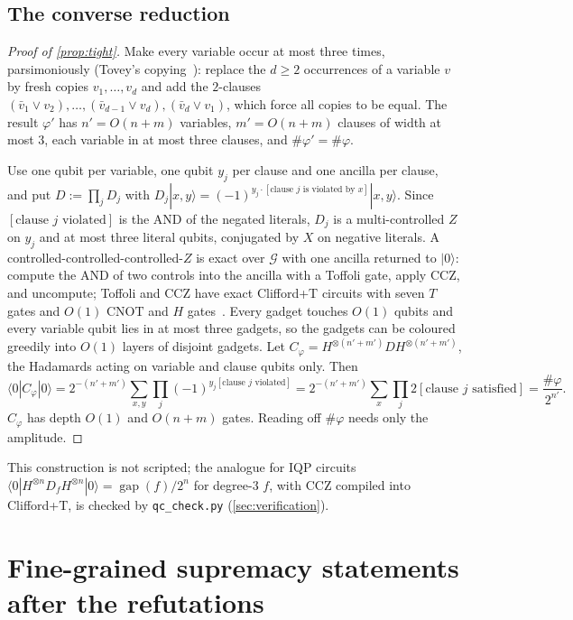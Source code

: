 \documentclass[10pt]{amsart}
\theoremstyle{plain}
\theoremstyle{definition}
\theoremstyle{remark}
\numberwithin{equation}{section}
\newcommand{\gap}{\operatorname{gap}}
\newcommand{\cG}{\mathcal{G}}
\newcommand{\ket}[1]{|#1\rangle}
\newcommand{\amp}[3]{\langle #1|#2|#3\rangle}
\begin{document}
\subsection{The converse reduction}\label{sec:converse}
\begin{proof}[Proof of \cref{prop:tight}]
Make every variable occur at most three times, parsimoniously (Tovey's copying~\cite{Tovey84}): replace the $d\ge2$ occurrences of a
variable $v$ by fresh copies $v_1,\dots,v_d$ and add the $2$-clauses
$(\bar v_1\vee v_2),\dots,(\bar v_{d-1}\vee v_d),(\bar v_d\vee v_1)$, which force all copies to be
equal. The result $\varphi'$ has $n'=O(n+m)$ variables, $m'=O(n+m)$ clauses of width at most $3$,
each variable in at most three clauses, and $\#\varphi'=\#\varphi$.

Use one qubit per variable, one qubit $y_j$ per clause and one ancilla per clause, and put
$D:=\prod_jD_j$ with $D_j\ket{x,y}=(-1)^{y_j\cdot[\text{clause }j\text{ is violated by }x]}\ket{x,y}$.
Since $[\text{clause } j\text{ violated}]$ is the AND of the negated literals, $D_j$ is a
multi-controlled $Z$ on $y_j$ and at most three literal qubits, conjugated by $X$ on negative
literals. A controlled-controlled-controlled-$Z$ is exact over $\cG$ with one ancilla returned to
$\ket0$: compute the AND of two controls into the ancilla with a Toffoli gate, apply $\mathrm{CCZ}$,
and uncompute; Toffoli and $\mathrm{CCZ}$ have exact Clifford+T circuits with seven $T$ gates and
$O(1)$ $\mathrm{CNOT}$ and $H$ gates~\cite{NielsenChuang}. Every gadget touches $O(1)$ qubits and every variable
qubit lies in at most three gadgets, so the gadgets can be coloured greedily into $O(1)$ layers of
disjoint gadgets. Let $C_\varphi=H^{\otimes(n'+m')}DH^{\otimes(n'+m')}$, the Hadamards acting on
variable and clause qubits only. Then
\[
 \amp{0}{C_\varphi}{0}=2^{-(n'+m')}\sum_{x,y}\prod_j(-1)^{y_j[\text{clause }j\text{ violated}]}
 =2^{-(n'+m')}\sum_x\prod_j2[\text{clause }j\text{ satisfied}]=\frac{\#\varphi}{2^{n'}}.
\]
$C_\varphi$ has depth $O(1)$ and $O(n+m)$ gates. Reading off $\#\varphi$ needs only the amplitude.
\end{proof}

This construction is not scripted; the analogue for IQP circuits~\cite{BJS11}
$\amp{0}{H^{\otimes n}D_fH^{\otimes n}}{0}=\gap(f)/2^n$ for degree-$3$ $f$, with $\mathrm{CCZ}$
compiled into Clifford+T, is checked by \texttt{qc\_check.py} (\cref{sec:verification}).

\section{Fine-grained supremacy statements after the refutations}\label{sec:table}
\end{document}
